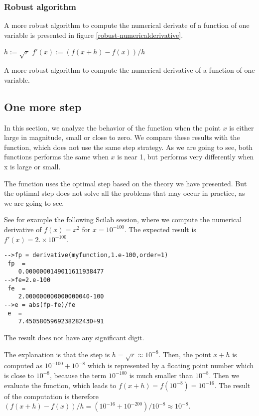 \subsubsection{Robust algorithm}

A more robust algorithm to compute the numerical derivate of 
a function of one variable is presented in figure \ref{robust-numericalderivative}.

\begin{algorithm}[htbp]
$h := \sqrt{r}$\;
$f'(x) := (f(x+h)-f(x))/h$\;
\caption{A more robust algorithm to compute the numerical derivative of a function of one variable.}
\label{robust-numericalderivative}
\end{algorithm}

\subsection{One more step}

In this section, we analyze the behavior of the  function 
when the point $x$ is either large in magnitude, 
small or close to zero. 
We compare these results with the  function,
which does not use the same step strategy. As we are going 
to see, both functions performs the same when $x$ is near 1, but 
performs very differently when x is large or small.

The  function uses the optimal step 
based on the theory we have presented. But the optimal step does not 
solve all the problems that may occur in practice, as we are going to 
see. 

See for example the following Scilab session, where we compute the 
numerical derivative of $f(x)=x^2$ for $x=10^{-100}$. The 
expected result is $f'(x) = 2. \times 10^{-100}$.
\begin{lstlisting}
-->fp = derivative(myfunction,1.e-100,order=1)
 fp  =
    0.0000000149011611938477  
-->fe=2.e-100
 fe  =
    2.000000000000000040-100  
-->e = abs(fp-fe)/fe
 e  =
    7.450580596923828243D+91  
\end{lstlisting}

The result does not have any significant digit.

The explanation is that the step is $h = \sqrt{r}\approx 10^{-8}$.
Then, the point $x+h$ is computed as $10^{-100} + 10^{-8}$ which is 
represented by a floating point number which is close to $10^{-8}$, because the 
term $10^{-100}$ is much smaller than $10^{-8}$. 
Then we evaluate the function, which leads to $f(x+h)=f(10^{-8}) = 10^{-16}$. The result of the 
computation is therefore $(f(x+h) - f(x))/h = (10^{-16} + 10^{-200})/10^{-8} \approx 10^{-8}$.

